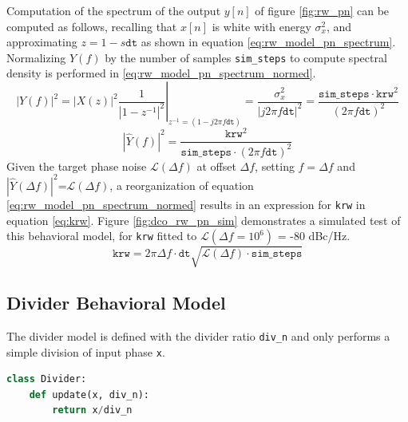 Computation of the spectrum of the output $y[n]$ of figure \ref{fig:rw_pn} can be computed as follows, recalling that $x[n]$ is white with energy $\sigma_x^2$, and approximating $z = 1-s\mathtt{dt}$ as shown in equation \ref{eq:rw_model_pn_spectrum}. Normalizing $Y(f)$ by the number of samples \texttt{sim\_steps} to compute spectral density is performed in \ref{eq:rw_model_pn_spectrum_normed}.
\begin{equation}\label{eq:rw_model_pn_spectrum}
|Y(f)|^{2} = \left.|X(z)|^{2}\frac{1}{|1-z^{-1}|^2}\right|_{z^{-1}=(1-j2\pi f\mathtt{dt})} = \frac{\sigma_x^2}{|j2\pi f\mathtt{dt}|^2} = \frac{\mathtt{sim\_steps}\cdot\texttt{krw}^2}{(2\pi f\mathtt{dt})^2}
\end{equation}
\begin{equation}\label{eq:rw_model_pn_spectrum_normed}
|\hat Y(f)|^{2} = \frac{\texttt{krw}^2}{\mathtt{sim\_steps}\cdot(2\pi f\mathtt{dt})^2}
\end{equation}
Given the target phase noise $\mathcal{L}(\Delta f)$ at offset $\Delta f$, setting $f=\Delta f$ and $|\hat Y(\Delta f)|^{2}$=$\mathcal{L}(\Delta f)$, a reorganization of equation \ref{eq:rw_model_pn_spectrum_normed} results in an expression for \texttt{krw} in equation \ref{eq:krw}. Figure \ref{fig:dco_rw_pn_sim} demonstrates a simulated test of this behavioral model, for \texttt{krw} fitted to $\mathcal{L}(\Delta f=10^6)$ = -80 dBc/Hz.
\begin{equation}\label{eq:krw}
\texttt{krw} = 2\pi \Delta f\cdot\mathtt{dt}\sqrt{\mathcal{L}(\Delta f)\cdot\mathtt{sim\_steps}}
\end{equation}



\subsection{Divider Behavioral Model}
The divider model is defined with the divider ratio \texttt{div\_n} and only performs a simple division of input phase \texttt{x}.
\begin{lstlisting}[language={Python}, caption={Divider behavioral model Python pseudocode.}, label={div_code}]
class Divider:
	def update(x, div_n):
		return x/div_n
\end{lstlisting}

